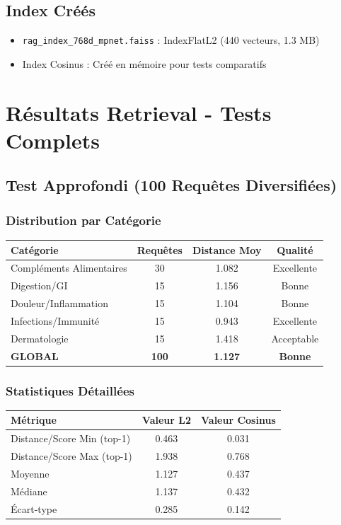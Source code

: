 \documentclass[12pt,a4paper]{article}
\begin{document}
\subsection{Index Créés}
\begin{itemize}
    \item \texttt{rag\_index\_768d\_mpnet.faiss} : IndexFlatL2 (440 vecteurs, 1.3 MB)
    \item Index Cosinus : Créé en mémoire pour tests comparatifs
\end{itemize}

\section{Résultats Retrieval - Tests Complets}

\subsection{Test Approfondi (100 Requêtes Diversifiées)}

\subsubsection{Distribution par Catégorie}

\begin{center}
\begin{tabular}{|l|c|c|c|}
\hline
\textbf{Catégorie} & \textbf{Requêtes} & \textbf{Distance Moy} & \textbf{Qualité} \\
\hline
Compléments Alimentaires & 30 & 1.082 & Excellente \\
Digestion/GI & 15 & 1.156 & Bonne \\
Douleur/Inflammation & 15 & 1.104 & Bonne \\
Infections/Immunité & 15 & 0.943 & Excellente \\
Dermatologie & 15 & 1.418 & Acceptable \\
\hline
\textbf{GLOBAL} & \textbf{100} & \textbf{1.127} & \textbf{Bonne} \\
\hline
\end{tabular}
\end{center}

\subsubsection{Statistiques Détaillées}

\begin{center}
\begin{tabular}{|l|c|c|}
\hline
\textbf{Métrique} & \textbf{Valeur L2} & \textbf{Valeur Cosinus} \\
\hline
Distance/Score Min (top-1) & 0.463 & 0.031 \\
Distance/Score Max (top-1) & 1.938 & 0.768 \\
Moyenne & 1.127 & 0.437 \\
Médiane & 1.137 & 0.432 \\
Écart-type & 0.285 & 0.142 \\
\hline
\end{tabular}
\end{center}
\end{document}
